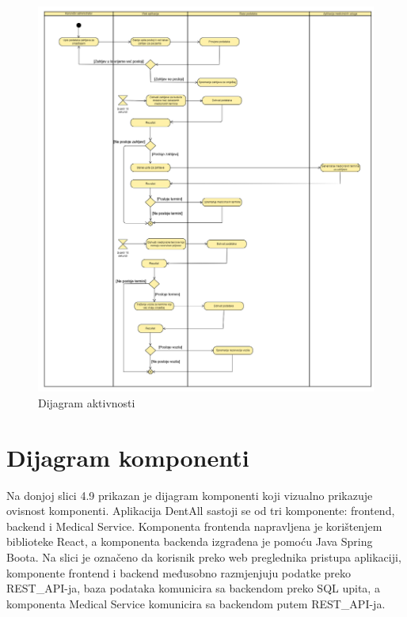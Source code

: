 			\begin{figure}[H]
				\includegraphics[width=\textwidth]{slike/activityDiagram.png}
				\centering
				\caption{Dijagram aktivnosti}
				\label{fig:dijagram-aktivnosti}
			\end{figure}
			
			\eject
		\section{Dijagram komponenti}
			
			Na donjoj slici 4.9 prikazan je dijagram komponenti koji
			vizualno prikazuje ovisnost komponenti. Aplikacija DentAll
			sastoji se od tri komponente: frontend, backend i Medical Service. 
			Komponenta frontenda napravljena je korištenjem biblioteke React, a komponenta
			backenda izgrađena je pomoću Java Spring Boota. Na slici je označeno da 
			korisnik preko web preglednika pristupa aplikaciji, komponente frontend 
			i backend međusobno razmjenjuju podatke preko REST\_API-ja, baza podataka
			komunicira sa backendom preko SQL upita, a komponenta Medical Service
			komunicira sa backendom putem REST\_API-ja.
			
